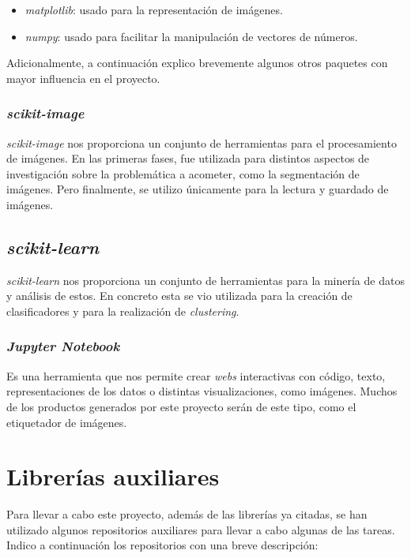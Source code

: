 \begin{itemize}
	\item \textit{matplotlib}: usado para la representación de imágenes.
	\item \textit{numpy}: usado para facilitar la manipulación de vectores de números.
\end{itemize}
 
Adicionalmente, a continuación explico brevemente algunos otros paquetes con mayor influencia en el proyecto.
 
\subsubsection{\textit{scikit-image}}

\textit{scikit-image} nos proporciona un conjunto de herramientas para el procesamiento de imágenes. En las primeras fases, fue utilizada para distintos aspectos de investigación sobre la problemática a acometer, como la segmentación de imágenes. Pero finalmente, se utilizo únicamente para la lectura y guardado de imágenes.

\subsection{\textit{scikit-learn}}
\textit{scikit-learn} nos proporciona un conjunto de herramientas para la minería de datos y análisis de estos. En concreto esta se vio utilizada para la creación de clasificadores y para la realización de \textit{clustering}.

\subsubsection{\textit{Jupyter Notebook}}

Es una herramienta que nos permite crear \textit{webs} interactivas con código, texto, representaciones de los datos o distintas visualizaciones, como imágenes. Muchos de los productos generados por este proyecto serán de este tipo, como el etiquetador de imágenes.

\section{Librerías auxiliares}

Para llevar a cabo este proyecto, además de las librerías ya citadas, se han utilizado algunos repositorios auxiliares para llevar a cabo algunas de las tareas. Indico a continuación los repositorios con una breve descripción:

